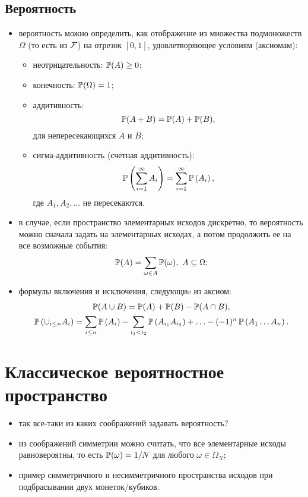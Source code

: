 \subsection*{Вероятность}
\begin{itemize}
    \item
    вероятность можно определить, как отображение из множества подмоножеств $\Omega$ (то есть из $\operatorname{\mathcal{F}}$) на отрезок $[0, 1]$, удовлетворяющее условиям (аксиомам):
    \begin{itemize}
        \item
        неотрицательность: $\operatorname{\mathbb{P}}(A) \geq 0$;
        \item
        конечность: $\operatorname{\mathbb{P}}(\Omega) = 1$;
        \item
        аддитивность: 
        \[
            \operatorname{\mathbb{P}}(A + B) = \operatorname{\mathbb{P}}(A) + \operatorname{\mathbb{P}}(B),
        \]
        для непересекающихся $A$ и $B$;
        \item
        сигма-аддитивность (счетная аддитивность):
        \[
            \operatorname{\mathbb{P}}\left( \sum_{i=1}^\infty A_i \right) = \sum_{i=1}^\infty\operatorname{\mathbb{P}}\left( A_i \right),
        \]
        где $A_1, A_2, \ldots$ не пересекаются.
    \end{itemize}
    \item
    в случае, если пространство элементарных исходов дискретно, то вероятность можно сначала задать на элементарных исходах, а потом продолжить ее на все возможные события:
    \[
        \operatorname{\mathbb{P}}(A) = \sum_{\omega \in A} \operatorname{\mathbb{P}}(\omega),\ A \subseteq \Omega;
    \]
    \item
    формулы включения и исключения, следующиe из аксиом:
    \begin{gather*}
        \operatorname{\mathbb{P}}(A \cup B) = \operatorname{\mathbb{P}}(A) + \operatorname{\mathbb{P}}(B) - \operatorname{\mathbb{P}}(A \cap B), \\
        \operatorname{\mathbb{P}}\left( \cup_{i \leq n} A_i \right) = \sum_{i \leq n} \operatorname{\mathbb{P}}\left( A_i \right) - \sum_{i_1 < i_2} \operatorname{\mathbb{P}}\left( A_{i_1} A_{i_2} \right) + \ldots - (-1)^n \operatorname{\mathbb{P}}\left( A_1 \ldots A_n \right).
    \end{gather*}
\end{itemize}

\section*{Классическое вероятностное пространство}
\begin{itemize}
    \item
    так все-таки из каких соображений задавать вероятность?
    \item
    из соображений симметрии можно считать, что все элементарные исходы равновероятны, то есть $\operatorname{\mathbb{P}}(\omega) = 1 / N$ для любого $\omega \in \Omega_N$;
    \item
    пример симметричного и несимметричного пространства исходов при подбрасывании двух монеток/кубиков.    
\end{itemize}

